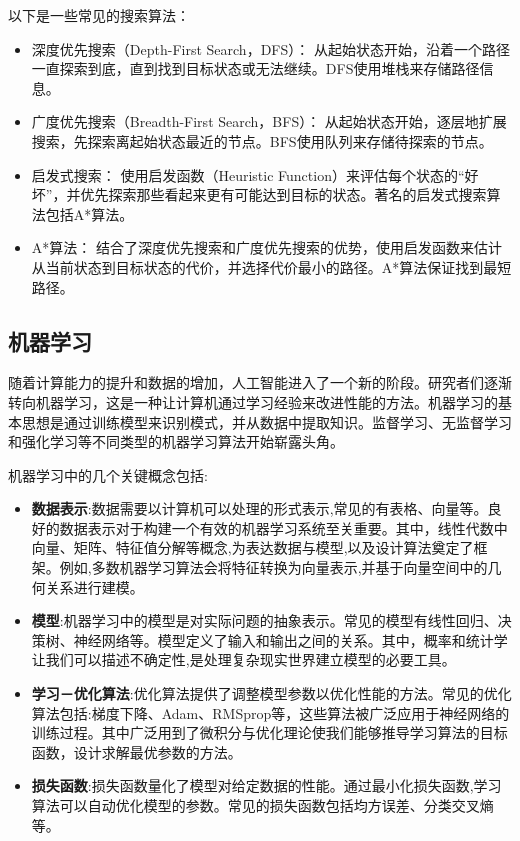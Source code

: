 以下是一些常见的搜索算法：
\begin{itemize}
\item 深度优先搜索（Depth-First Search，DFS）： 从起始状态开始，沿着一个路径一直探索到底，直到找到目标状态或无法继续。DFS使用堆栈来存储路径信息。
\item 广度优先搜索（Breadth-First Search，BFS）： 从起始状态开始，逐层地扩展搜索，先探索离起始状态最近的节点。BFS使用队列来存储待探索的节点。
\item 启发式搜索： 使用启发函数（Heuristic Function）来评估每个状态的“好坏”，并优先探索那些看起来更有可能达到目标的状态。著名的启发式搜索算法包括A*算法。
\item A*算法： 结合了深度优先搜索和广度优先搜索的优势，使用启发函数来估计从当前状态到目标状态的代价，并选择代价最小的路径。A*算法保证找到最短路径。
\end{itemize}

\subsection{机器学习}

随着计算能力的提升和数据的增加，人工智能进入了一个新的阶段。研究者们逐渐转向机器学习，这是一种让计算机通过学习经验来改进性能的方法。机器学习的基本思想是通过训练模型来识别模式，并从数据中提取知识。监督学习、无监督学习和强化学习等不同类型的机器学习算法开始崭露头角。

机器学习中的几个关键概念包括:
\begin{itemize}
\item \textbf{数据表示}:数据需要以计算机可以处理的形式表示,常见的有表格、向量等。良好的数据表示对于构建一个有效的机器学习系统至关重要。其中，线性代数中向量、矩阵、特征值分解等概念,为表达数据与模型,以及设计算法奠定了框架。例如,多数机器学习算法会将特征转换为向量表示,并基于向量空间中的几何关系进行建模。

\item \textbf{模型}:机器学习中的模型是对实际问题的抽象表示。常见的模型有线性回归、决策树、神经网络等。模型定义了输入和输出之间的关系。其中，概率和统计学让我们可以描述不确定性,是处理复杂现实世界建立模型的必要工具。

\item \textbf{学习－优化算法}:优化算法提供了调整模型参数以优化性能的方法。常见的优化算法包括:梯度下降、Adam、RMSprop等，这些算法被广泛应用于神经网络的训练过程。其中广泛用到了微积分与优化理论使我们能够推导学习算法的目标函数，设计求解最优参数的方法。

\item \textbf{损失函数}:损失函数量化了模型对给定数据的性能。通过最小化损失函数,学习算法可以自动优化模型的参数。常见的损失函数包括均方误差、分类交叉熵等。
\end{itemize}

